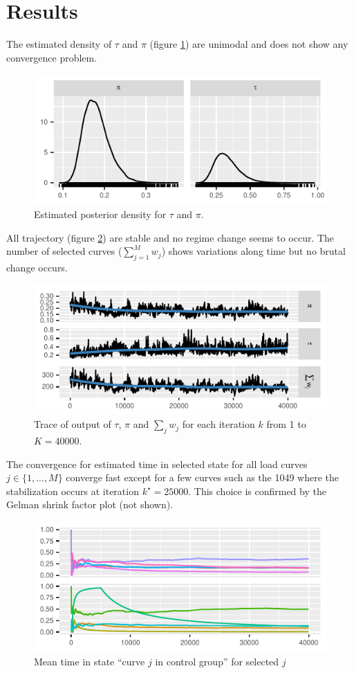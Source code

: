 \documentclass[journal]{IEEEtran}
\begin{document}
\section{Results}
The estimated density of $\tau$ and $\pi$ (figure
\ref{fig:densityTauPi}) are unimodal and does not show any convergence
problem.
\begin{figure}[!h]
  \centering
  \includegraphics{density_param_tau_pi}
  \caption{Estimated posterior density for $\tau$ and $\pi$.}
  \label{fig:densityTauPi}
\end{figure}
All trajectory (figure \ref{fig:densityTauPiSumWj}) are stable and no
regime change seems to occur. The number of selected curves
($\sum_{j=1}^{M}{w_j}$) shows variations along time but no brutal
change occurs.
\begin{figure}[!h]
  \centering
  \includegraphics{trajectory_tau_pi_sum}
  \caption{Trace of output of $\tau$, $\pi$ and $\sum_j w_j$ for each iteration $k$ from 1 to $K=40000$.}
  \label{fig:densityTauPiSumWj}
\end{figure}
The convergence for estimated time in selected state for all load
curves $j\in\{1,\dotsc,M\}$ converge fast except for a few curves such
as the 1049 where the stabilization occurs at iteration
$k^\star=25000$. This choice is confirmed by the Gelman shrink factor
plot (not shown).
\begin{figure}[!h]
  \centering
  \includegraphics{meantime}
  \caption{Mean time in state ``curve $j$ in control group'' for selected $j$}
  \label{fig:meantime}
\end{figure}
\end{document}
